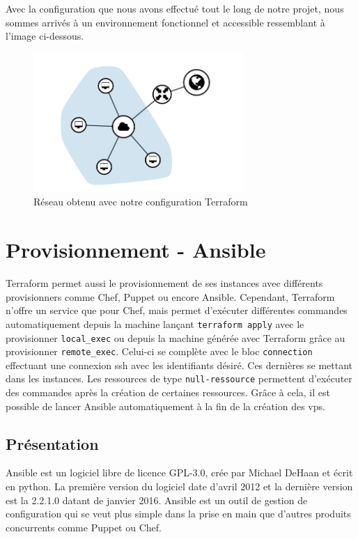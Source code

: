 \documentclass[]{article}
\begin{document}
\vspace{1cm}
Avec la configuration que nous avons effectué tout le long de notre projet, nous sommes arrivés à un environnement fonctionnel et accessible ressemblant à l'image ci-dessous.
\begin{figure}
\centering
\includegraphics[height=200px]{Images/reseau.png}
\caption{Réseau obtenu avec notre configuration Terraform}
\end{figure}

\newpage
\section{Provisionnement - Ansible}\label{provisionnement}

Terraform permet aussi le provisionnement de ses instances avec
différents provisionners comme Chef, Puppet ou encore Ansible.
Cependant, Terraform n'offre un service que pour Chef, mais permet
d'exécuter différentes commandes automatiquement depuis la machine
lançant \texttt{terraform\ apply} avec le provisionner
\texttt{local\_exec} ou depuis la machine générée avec Terraform grâce
au provisionner \texttt{remote\_exec}. Celui-ci se complète avec le bloc
\texttt{connection} effectuant une connexion ssh avec les identifiants
désiré. Ces dernières se mettant dans les instances. Les ressources de
type \texttt{null-ressource} permettent d'exécuter des commandes après
la création de certaines ressources. Grâce à cela, il est possible de
lancer Ansible automatiquement à la fin de la création des vps.

\subsection{Présentation}\label{pruxe9sentation}

Ansible est un logiciel libre de licence GPL-3.0, crée par Michael
DeHaan et écrit en python. La première version du logiciel date d'avril
2012 et la dernière version est la 2.2.1.0 datant de janvier 2016.
Ansible est un outil de gestion de configuration qui se veut plus simple
dans la prise en main que d'autres produits concurrents comme Puppet ou
Chef.
\end{document}
